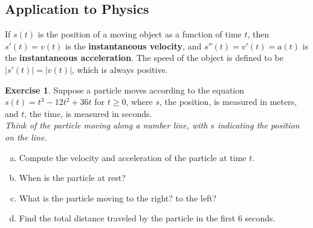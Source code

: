 \documentclass[11pt,reqno,final]{amsart}
\numberwithin{figure}{section}
\theoremstyle{definition} %
\newtheorem{exercise}[question]{Exercise}
\begin{document}
\newpage

\subsection{Application to Physics}

If $s(t)$ is the position of a moving object as a function of time $t$, then
$s'(t) = v(t)$ is the \textbf{instantaneous velocity}, and
$s''(t) = v'(t) = a(t)$ is the \textbf{instantaneous acceleration}.
The speed of the object is defined to be $|s'(t)| = |v(t)|$, which is always positive.

\begin{exercise}
        Suppose a particle moves according to the equation $s(t) = t^3 - 12t^2 + 36t$ for $t \geq 0$,
        where $s$, the position, is measured in meters, and $t$, the time, is measured in seconds.\\
        \textit{Think of the particle moving along a number line, with $s$ indicating the position on the line.}
        \begin{enumerate}[(a)]
        \item Compute the velocity and acceleration of the particle at time $t$.
                \vfill
        \item When is the particle at rest?
                \vfill
        \item What is the particle moving to the right? to the left?
                \vfill
        \item Find the total distance traveled by the particle in the first 6 seconds.
                \vfill
        \end{enumerate}
        
\end{exercise}
\end{document}
